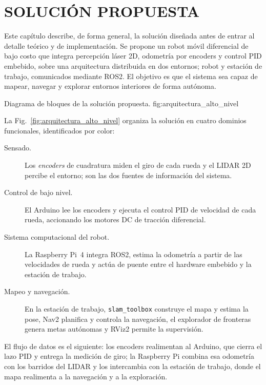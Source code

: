 \chapter{SOLUCIÓN PROPUESTA}
\label{ch:solucion}

Este capítulo describe, de forma general, la solución diseñada antes de entrar
al detalle teórico y de implementación. Se propone un robot móvil diferencial
de bajo costo que integra percepción láser 2D, odometría por encoders y control
PID embebido, sobre una arquitectura distribuida en dos entornos; robot y
estación de trabajo, comunicados mediante \gls{ROS2}. El objetivo es que el
sistema sea capaz de mapear, navegar y explorar entornos interiores de forma
autónoma.

{Diagrama de bloques de la solución propuesta.}
{fig:arquitectura_alto_nivel}

La Fig.~\ref{fig:arquitectura_alto_nivel} organiza la solución en cuatro
dominios funcionales, identificados por color:

\begin{description}
  \item[Sensado.] Los \emph{encoders} de cuadratura miden el giro de cada rueda
  y el \gls{LIDAR} 2D percibe el entorno; son las dos fuentes de información del
  sistema.
  \item[Control de bajo nivel.] El \gls{Arduino} lee los encoders y ejecuta el
  control PID de velocidad de cada rueda, accionando los motores DC de tracción
  diferencial.
  \item[Sistema computacional del robot.] La Raspberry Pi~4 integra \gls{ROS2},
  estima la odometría a partir de las velocidades de rueda y actúa de puente
  entre el hardware embebido y la estación de trabajo.
  \item[Mapeo y navegación.] En la estación de trabajo, \texttt{slam\_toolbox}
  construye el mapa y estima la pose, Nav2 planifica y controla la navegación,
  el explorador de fronteras genera metas autónomas y RViz2 permite la
  supervisión.
\end{description}

El flujo de datos es el siguiente: los encoders realimentan al Arduino, que
cierra el lazo PID y entrega la medición de giro; la Raspberry Pi combina esa
odometría con los barridos del \gls{LIDAR} y los intercambia con la estación de
trabajo, donde el mapa realimenta a la navegación y a la exploración.